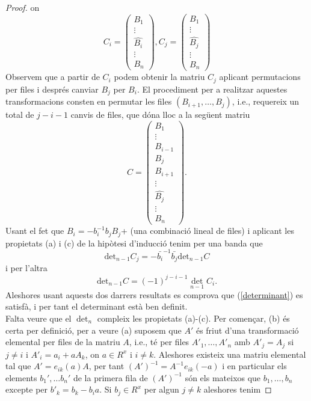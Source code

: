 \begin{proof}
 on 
 $$
 C_i = \left( \begin{matrix}
  B_1  \\
  \vdots \\
  \hat{B_i} \\
  \vdots \\
  B_n 
 \end{matrix} \right),
 C_j=\left( \begin{matrix}
  B_1  \\
  \vdots \\
  \hat{B_j} \\
  \vdots \\
  B_n 
 \end{matrix} \right)
 $$
Observem que a partir de $C_i$ podem obtenir la matriu $C_j$ aplicant permutacions per files i després canviar $B_j$ per $B_i$. El procediment per a realitzar aquestes transformacions consten en permutar les files $(B_{i+1},\dots , B_j)$, i.e., requereix un total de $j-i-1$ canvis de files, que dóna lloc a la següent matriu
 $$
 C=\left( \begin{matrix}
  B_1  \\
  \vdots \\
  B_{i-1} \\
  B_j \\
  B_{i+1}\\
  \vdots \\
  \hat{B_j}\\
  \vdots \\
  B_n 
 \end{matrix} \right).
 $$
Usant el fet que $B_i=-b_i^{-1}b_jB_j$+ (una combinació lineal de files) i aplicant les propietats (a) i (c) de la hipòtesi d'inducció tenim per una banda que 
$$\text{det}_{n-1}C_j=-\bar{b_i}^{-1}\bar{b_j}\text{det}_{n-1}C$$
 i per l'altra
 $$\text{det}_{n-1}C = (-1)^{j-i-1} \det_{n-1}C_i.$$
Aleshores usant aquests dos darrers resultats es comprova que (\ref{determinant}) es satisfà, i per tant el determinant està ben definit. \\
\indent Falta veure que el $\det_n$ compleix les propietats (a)-(c). Per començar, (b) és certa per definició, per a veure (a) suposem que $A'$ és friut d'una transformació elemental per files de la matriu $A$, i.e.,  té per files $A'_1 , \dots , A'_n$ amb $A'_j = A_j$ si $j\neq i$ i $A'_i=a_i+aA_k$, on $a\in R^x$ i $i\neq k$. Aleshores existeix una matriu elemental tal que $A' = e_{ik}(a)A$, per tant $(A')^{-1} = A^{-1}e_{ik}(-a)$ i en particular els elements $b_1' , \dots b_n'$ de la primera fila de $(A')^{-1}$ són els mateixos que $b_1 , \dots , b_n$ excepte per $b'_k = b_k - b_i a$. Si $b_j\in R^x$ per algun $j\neq k$ aleshores tenim

\end{proof}
